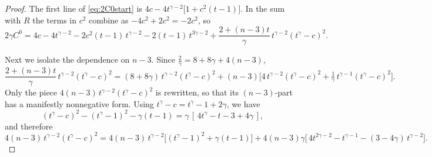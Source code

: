 \documentclass[11pt]{amsart}
\theoremstyle{definition}
\theoremstyle{remark}
\numberwithin{equation}{section}
\begin{document}
\begin{proof}
\medskip
\noindent
The first line of \eqref{eq:2C0start} is $4c-4t^{\gamma-2}\big[1+c^2(t-1)\big]$. In the sum with $R$ the terms in $c^2$ combine as $-4c^2+2c^2=-2c^2$, so
\begin{equation}\label{A}
  2\gamma C^0=4c-4t^{\gamma-2}-2c^2(t-1)\,t^{\gamma-2}-2(t-1)\,t^{3\gamma-2}
  +\frac{2+(n-3)t}{\gamma}\,t^{\gamma-2}(t^\gamma-c)^2 .
\end{equation}

\medskip
\noindent
Next we isolate the dependence on $n-3$. Since $\frac2\gamma=8+8\gamma+4(n-3)$,
\[
  \frac{2+(n-3)t}{\gamma}\,t^{\gamma-2}(t^\gamma-c)^2
  =(8+8\gamma)\,t^{\gamma-2}(t^\gamma-c)^2
  +(n-3)\Big[4\,t^{\gamma-2}(t^\gamma-c)^2+\tfrac1\gamma\, t^{\gamma-1}(t^\gamma-c)^2\Big].
\]
Only the piece $4(n-3)\,t^{\gamma-2}(t^\gamma-c)^2$ is rewritten, so that its $(n-3)$-part has a manifestly nonnegative form. Using $t^\gamma-c=t^\gamma-1+2\gamma$, we have
\[
  (t^\gamma-c)^2-(t^\gamma-1)^2-\gamma(t-1)=\gamma\,[\,4t^\gamma-t-3+4\gamma\,],
\]
and therefore
\[
  4(n-3)\,t^{\gamma-2}(t^\gamma-c)^2
  =4(n-3)\,t^{\gamma-2}\big[(t^\gamma-1)^2+\gamma(t-1)\big]
  +4(n-3)\gamma\big[\,4t^{2\gamma-2}-t^{\gamma-1}-(3-4\gamma)\,t^{\gamma-2}\big].
\]


\end{proof}
\end{document}
